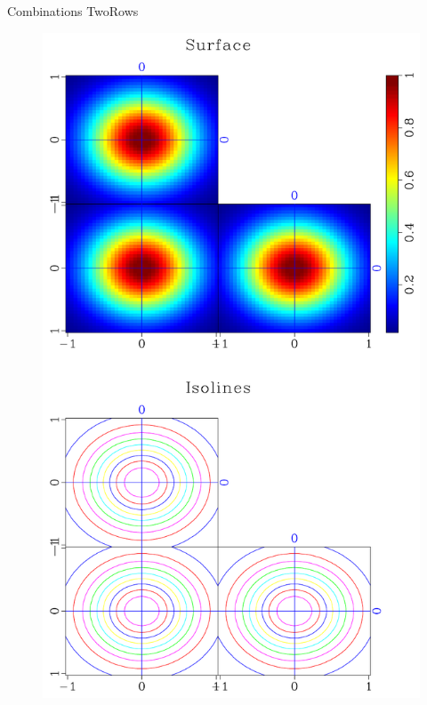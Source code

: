 \begin{frame}
  \begin{block}{Combinations}
    TwoRows \\

     \begin{figure}
     \includegraphics[scale=0.25]{plot/Fig/ganom-5.pdf}
     \end{figure}

  \end{block}
\end{frame}
        
